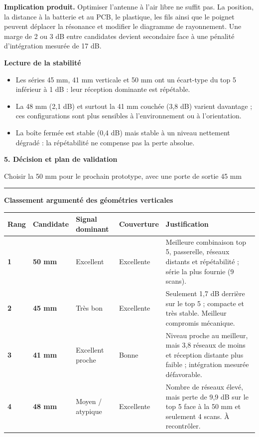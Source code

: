 \documentclass[10pt,a4paper]{article}
\newcommand{\sectiontitle}[2]{%
  {\color{navy}\fontsize{19}{21}\selectfont\bfseries #1}\par
  {\color{muted}\small #2}\par\vspace{4pt}
  {\color{cyan}\rule{19mm}{2pt}}\vspace{5pt}
}
\begin{document}
\vspace{5mm}
\begin{warningbox}
\textbf{Implication produit.} Optimiser l'antenne à l'air libre ne suffit pas. La position, la distance à la batterie et au PCB, le plastique, les fils ainsi que le poignet peuvent déplacer la résonance et modifier le diagramme de rayonnement. Une marge de 2 ou 3 dB entre candidates devient secondaire face à une pénalité d'intégration mesurée de 17 dB.
\end{warningbox}

\vspace{3mm}
\textbf{Lecture de la stabilité}
\begin{itemize}
  \item Les séries 45 mm, 41 mm verticale et 50 mm ont un écart-type du top 5 inférieur à 1 dB : leur réception dominante est répétable.
  \item La 48 mm (2,1 dB) et surtout la 41 mm couchée (3,8 dB) varient davantage ; ces configurations sont plus sensibles à l'environnement ou à l'orientation.
  \item La boîte fermée est stable (0,4 dB) mais stable à un niveau nettement dégradé : la répétabilité ne compense pas la perte absolue.
\end{itemize}
\newpage

\sectiontitle{5. Décision et plan de validation}{Choisir la 50 mm pour le prochain prototype, avec une porte de sortie 45 mm}

\textbf{Classement argumenté des géométries verticales}\par\smallskip
\begin{tabularx}{\textwidth}{C{11mm} >{\bfseries}p{28mm} C{22mm} C{22mm} Y}
\toprule
Rang & Candidate & Signal dominant & Couverture & Justification \\
\midrule
{}\textbf{1} & 50 mm & Excellent & Excellente & Meilleure combinaison top 5, passerelle, réseaux distants et répétabilité ; série la plus fournie (9 scans). \\
\textbf{2} & 45 mm & Très bon & Excellente & Seulement 1,7 dB derrière sur le top 5 ; compacte et très stable. Meilleur compromis mécanique. \\
\textbf{3} & 41 mm & Excellent proche & Bonne & Niveau proche au meilleur, mais 3,8 réseaux de moins et réception distante plus faible ; intégration mesurée défavorable. \\
\textbf{4} & 48 mm & Moyen / atypique & Excellente & Nombre de réseaux élevé, mais perte de 9,9 dB sur le top 5 face à la 50 mm et seulement 4 scans. À recontrôler. \\
\bottomrule
\end{tabularx}
\end{document}

